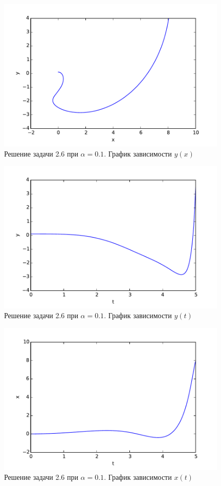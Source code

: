 \documentclass[a4paper,14pt]{article}
\begin{document}
\begin{figure}[H]
\centering
    \includegraphics[width=110mm]{pictures/01x-y.pdf}
    \caption{Решение задачи 2.6 при $\alpha = 0.1$. График зависимости $y(x)$}
    \label{1myx-y}
\end{figure}
\begin{figure}[H]
\centering
    \includegraphics[width=110mm]{pictures/01t-y.pdf}
    \caption{Решение задачи 2.6 при $\alpha = 0.1$. График зависимости $y(t)$}
    \label{1myt-y} 
\end{figure}
\begin{figure}[H]
\centering
    \includegraphics[width=110mm]{pictures/01t-x.pdf}
    \caption{Решение задачи 2.6 при $\alpha = 0.1$. График зависимости $x(t)$}
    \label{1myt-x}
\end{figure}
\end{document}
